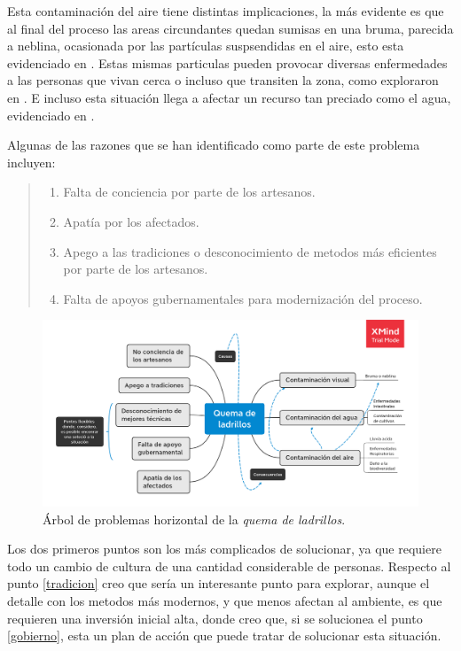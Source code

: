 \documentclass[12pt]{article}
\begin{document}
	\par Esta contaminaci\'on del aire tiene distintas implicaciones, la m\'as evidente es que al final del proceso las areas circundantes quedan sumisas en una bruma, parecida a neblina, ocasionada por las part\'iculas suspsendidas en el aire, esto esta evidenciado en \cite{ladrillos-visual}. Estas mismas particulas pueden provocar diversas enfermedades a las personas que vivan cerca o incluso que transiten la zona, como exploraron en \cite{enfermedades}. E incluso esta situaci\'on llega a afectar un recurso tan preciado como el agua, evidenciado en \cite{agua}.

	\par Algunas de las razones que se han identificado como parte de este problema incluyen:
	\begin{quote}\begin{enumerate}
		\item Falta de conciencia por parte de los artesanos.
		\item Apat\'ia por los afectados.
		\item Apego a las tradiciones o desconocimiento de metodos m\'as eficientes por parte de los artesanos. \label{tradicion}
		\item Falta de apoyos gubernamentales para modernizaci\'on del proceso. \label{gobierno}
	\end{enumerate}\end{quote}
	
\begin{figure}[]
	\centering
	\includegraphics [width=\textwidth] {Mapa_ladrillos.png}
	\caption{\'Arbol de problemas horizontal de la \textit{quema de ladrillos}.}
\end{figure}
	
	\par Los dos primeros puntos son los m\'as complicados de solucionar, ya que requiere todo un cambio de cultura de una cantidad considerable de personas. Respecto al punto \ref{tradicion} creo que ser\'ia un interesante punto para explorar, aunque el detalle con los metodos m\'as modernos, y que menos afectan al ambiente, es que requieren una inversi\'on inicial alta, donde creo que, si se solucionea el punto \ref{gobierno}, esta un plan de acci\'on que puede tratar de solucionar esta situaci\'on.
	
\end{document}
